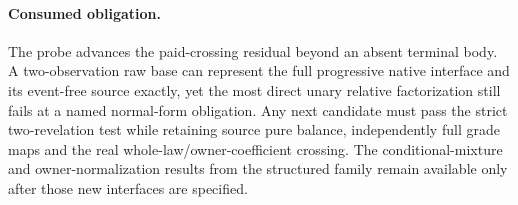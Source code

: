 \documentclass[11pt]{article}\usepackage{amsmath,amssymb,amsthm,geometry}\geometry{margin=1in}
\begin{document}
\paragraph{Consumed obligation.} The probe advances the paid-crossing residual beyond an absent terminal body. A two-observation raw base can represent the full progressive native interface and its event-free source exactly, yet the most direct unary relative factorization still fails at a named normal-form obligation. Any next candidate must pass the strict two-revelation test while retaining source pure balance, independently full grade maps and the real whole-law/owner-coefficient crossing. The conditional-mixture and owner-normalization results from the structured family remain available only after those new interfaces are specified.
\end{document}
